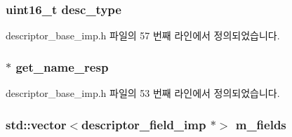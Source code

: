 \subsubsection[{\texorpdfstring{desc\+\_\+type}{desc_type}}]{\setlength{\rightskip}{0pt plus 5cm}uint16\+\_\+t desc\+\_\+type\hspace{0.3cm}{\ttfamily [protected]}}\hypertarget{classavdecc__lib_1_1descriptor__base__imp_a9dada313309522d04f1e52fe887442b4}{}\label{classavdecc__lib_1_1descriptor__base__imp_a9dada313309522d04f1e52fe887442b4}


descriptor\+\_\+base\+\_\+imp.\+h 파일의 57 번째 라인에서 정의되었습니다.

\subsubsection[{\texorpdfstring{get\+\_\+name\+\_\+resp}{get_name_resp}}]{$\ast$ get\+\_\+name\+\_\+resp\hspace{0.3cm}{\ttfamily [protected]}}\hypertarget{classavdecc__lib_1_1descriptor__base__imp_a7d3a410eb242dc2b7abe9862a1593458}{}\label{classavdecc__lib_1_1descriptor__base__imp_a7d3a410eb242dc2b7abe9862a1593458}


descriptor\+\_\+base\+\_\+imp.\+h 파일의 53 번째 라인에서 정의되었습니다.

\subsubsection[{\texorpdfstring{m\+\_\+fields}{m_fields}}]{\setlength{\rightskip}{0pt plus 5cm}std\+::vector$<${\bf descriptor\+\_\+field\+\_\+imp} $\ast$$>$ m\+\_\+fields\hspace{0.3cm}{\ttfamily [protected]}}\hypertarget{classavdecc__lib_1_1descriptor__base__imp_adce67136eb9c66da9c189b730077b9cd}{}\label{classavdecc__lib_1_1descriptor__base__imp_adce67136eb9c66da9c189b730077b9cd}


